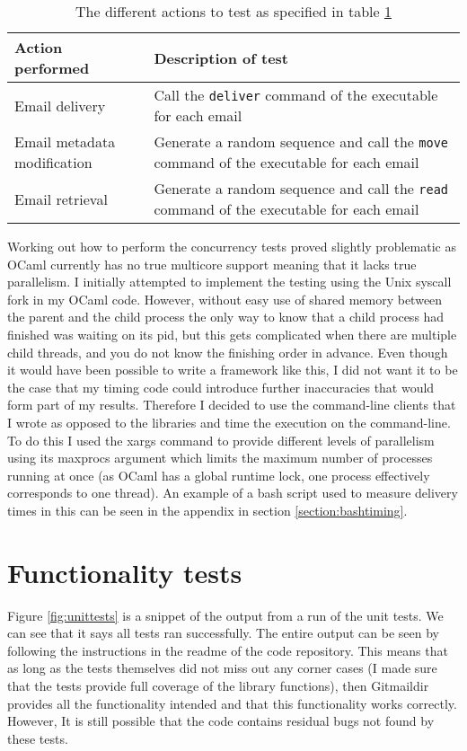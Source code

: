 \begin{table}[h]
\footnotesize
\centering
\begin{tabular}{p{4cm} p{10.5cm}}
  \toprule
  Action performed & Description of test \\
  \midrule
  Email delivery & Call the \texttt{deliver} command of the executable for each email \\
  Email metadata modification & Generate a random sequence and call the \texttt{move} command of the executable for each email \\
  Email retrieval & Generate a random sequence and call the \texttt{read} command of the executable for each email \\
  \bottomrule
\end{tabular}
\caption{The different actions to test as specified in table \ref{table:actions}}
\label{table:actions}
\end{table}

Working out how to perform the concurrency tests proved slightly problematic as OCaml currently has no true multicore support meaning that it lacks true parallelism. I initially attempted to implement the testing using the Unix syscall fork in my OCaml code. However, without easy use of shared memory between the parent and the child process the only way to know that a child process had finished was waiting on its pid, but this gets complicated when there are multiple child threads, and you do not know the finishing order in advance. Even though it would have been possible to write a framework like this, I did not want it to be the case that my timing code could introduce further inaccuracies that would form part of my results. Therefore I decided to use the command-line clients that I wrote as opposed to the libraries and time the execution on the command-line. To do this I used the xargs command to provide different levels of parallelism using its maxprocs argument which limits the maximum number of processes running at once (as OCaml has a global runtime lock, one process effectively corresponds to one thread). An example of a bash script used to measure delivery times in this can be seen in the appendix in section \ref{section:bashtiming}.

\section{Functionality tests} \label{section:functionality_tests}

Figure \ref{fig:unittests} is a snippet of the output from a run of the unit tests. We can see that it says all tests ran successfully. The entire output can be seen by following the instructions in the readme of the code repository. This means that as long as the tests themselves did not miss out any corner cases (I made sure that the tests provide full coverage of the library functions), then Gitmaildir provides all the functionality intended and that this functionality works correctly. However, It is still possible that the code contains residual bugs not found by these tests.

